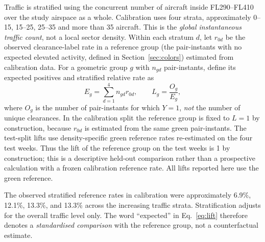 \documentclass[aerospace,article,submit,moreauthors]{Definitions/mdpi}
\begin{document}
Traffic is stratified using the concurrent number of aircraft inside FL290--FL410 over the study airspace as a whole. Calibration uses four strata, approximately 0--15, 15--25, 25--35 and more than 35 aircraft. This is the \emph{global instantaneous traffic count}, not a local sector density. Within each stratum $d$, let $r_{0d}$ be the observed clearance-label rate in a reference group (the pair-instants with no expected elevated activity, defined in Section~\ref{sec:colors}) estimated from calibration data. For a geometric group $g$ with $n_{gd}$ pair-instants, define its expected positives and stratified relative rate as
\begin{equation}\label{eq:lift}
 E_g=\sum_{d=1}^{4}n_{gd}r_{0d},\qquad L_g=\frac{O_g}{E_g},
\end{equation}
where $O_g$ is the number of pair-instants for which $Y=1$, \emph{not} the number of unique clearances. In the calibration split the reference group is fixed to $L=1$ by construction, because $r_{0d}$ is estimated from the same green pair-instants. The test-split lifts use density-specific green reference rates re-estimated on the four test weeks. Thus the lift of the reference group on the test weeks is 1 by construction; this is a descriptive held-out comparison rather than a prospective calculation with a frozen calibration reference rate. All lifts reported here use the green reference.

The observed stratified reference rates in calibration were approximately 6.9\%, 12.1\%, 13.3\%, and 13.3\% across the increasing traffic strata. Stratification adjusts for the overall traffic level only. The word ``expected'' in Eq.~\eqref{eq:lift} therefore denotes a \emph{standardised comparison} with the reference group, not a counterfactual estimate.
\end{document}
